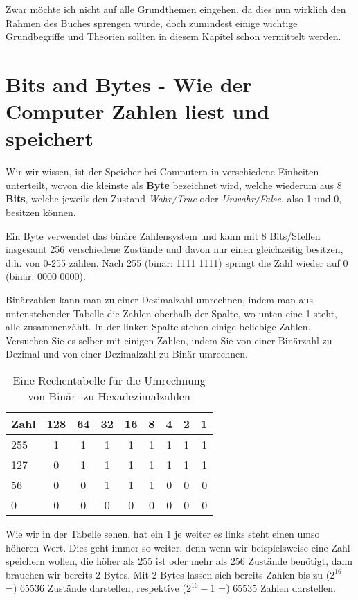 \documentclass[b5paper,10pt,dvips,fleqn,titlepage,twoside]{book}
\begin{document}
Zwar möchte ich nicht auf alle Grundthemen eingehen, da dies nun wirklich den Rahmen des Buches sprengen würde, doch zumindest einige wichtige Grundbegriffe und Theorien sollten in diesem Kapitel schon vermittelt werden.\newline
\newpage
\section{Bits and Bytes - Wie der Computer Zahlen liest und speichert}
Wir wir wissen, ist der Speicher bei Computern in verschiedene Einheiten unterteilt, wovon die kleinste als \textbf{Byte} bezeichnet wird, welche wiederum aus 8 \textbf{Bits}, welche jeweils den Zustand \emph{Wahr/True} oder \emph{Unwahr/False}, also 1 und 0, besitzen können.

Ein Byte verwendet das binäre Zahlensystem und kann mit 8 Bits/Stellen insgesamt 256 verschiedene Zustände und davon nur einen gleichzeitig  besitzen, d.h. von 0-255 zählen. Nach 255 (binär: 1111 1111) springt die Zahl wieder auf 0 (binär: 0000 0000).

Binärzahlen kann man zu einer Dezimalzahl umrechnen, indem man aus untenstehender Tabelle die Zahlen oberhalb der Spalte, wo unten eine 1 steht, alle zusammenzählt. In der linken Spalte stehen einige beliebige Zahlen. Versuchen Sie es selber mit einigen Zahlen, indem Sie von einer Binärzahl zu Dezimal und von einer Dezimalzahl zu Binär umrechnen.


\begin{table}[h]
\caption{Eine Rechentabelle für die Umrechnung von Binär- zu Hexadezimalzahlen}
\begin{tabular}{|l|c|c|c|c|c|c|c|r|}\hline
Zahl & 128 & 64 & 32 & 16 & 8 & 4 & 2 & 1 \\\hline\hline
255 & 1 & 1 & 1 & 1 & 1 & 1 & 1 & 1\\\hline
127 & 0 & 1 & 1 & 1 & 1 & 1 & 1 & 1\\\hline
56 & 0 & 0 & 1 & 1 & 1 & 0 & 0 & 0\\\hline
0 & 0 & 0 & 0 & 0 & 0 & 0 & 0 & 0\\\hline
\end{tabular}
\end{table}

Wie wir in der Tabelle sehen, hat ein 1 je weiter es links steht einen umso höheren Wert. Dies geht immer so weiter, denn wenn wir beispielsweise eine Zahl speichern wollen, die höher als 255 ist oder mehr als 256 Zustände benötigt, dann brauchen wir bereits 2 Bytes. Mit 2 Bytes lassen sich bereits Zahlen \newline bis zu  ($2^{16}$ =)  65536 Zustände darstellen, respektive ($2^{16}-1$ =) 65535 Zahlen darstellen.
\end{document}
